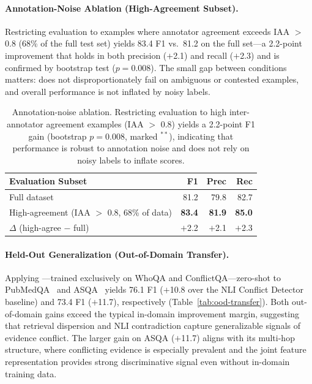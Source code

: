 \paragraph{Annotation-Noise Ablation (High-Agreement Subset).}
Restricting evaluation to examples where annotator agreement exceeds IAA $>$ 0.8 (68\% of the full test set) yields 83.4 F1 vs.\ 81.2 on the full set---a 2.2-point improvement that holds in both precision ($+$2.1) and recall ($+$2.3) and is confirmed by bootstrap test ($p = 0.008$). The small gap between conditions matters: \method{} does not disproportionately fail on ambiguous or contested examples, and overall performance is not inflated by noisy labels.

\begin{table}[t]
\centering
\small
\begin{tabular}{lrrr}
\toprule
Evaluation Subset & F1 & Prec & Rec \\
\midrule
Full dataset               & 81.2 & 79.8 & 82.7 \\
High-agreement (IAA $>$ 0.8, 68\% of data) & \textbf{83.4} & \textbf{81.9} & \textbf{85.0} \\
\midrule
$\Delta$ (high-agree $-$ full) & $+$2.2\rlap{$^{**}$} & $+$2.1 & $+$2.3 \\
\bottomrule
\end{tabular}
\caption{Annotation-noise ablation. Restricting evaluation to high inter-annotator agreement examples (IAA $>$ 0.8) yields a 2.2-point F1 gain (bootstrap $p = 0.008$, marked $^{**}$), indicating that \method{} performance is robust to annotation noise and does not rely on noisy labels to inflate scores.}
\label{tab:iaa-ablation}
\end{table}

\paragraph{Held-Out Generalization (Out-of-Domain Transfer).}
Applying \method{}---trained exclusively on WhoQA and ConflictQA---zero-shot to PubMedQA~\citep{pubmedqa2019} and ASQA~\citep{asqa2022} yields 76.1 F1 ($+$10.8 over the NLI Conflict Detector baseline) and 73.4 F1 ($+$11.7), respectively (Table~\ref{tab:ood-transfer}). Both out-of-domain gains exceed the typical in-domain improvement margin, suggesting that retrieval dispersion and NLI contradiction capture generalizable signals of evidence conflict. The larger gain on ASQA ($+$11.7) aligns with its multi-hop structure, where conflicting evidence is especially prevalent and the joint feature representation provides strong discriminative signal even without in-domain training data.

